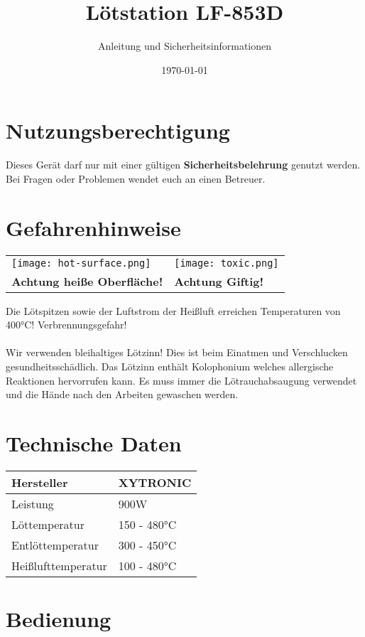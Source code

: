 \documentclass[a4paper]{article}
\begin{document}
\author{Anleitung und Sicherheitsinformationen} %
\title{Lötstation LF-853D}
\date{\today{}} %
\maketitle{} %
\section{Nutzungsberechtigung}
Dieses Gerät darf nur mit einer gültigen \textbf{Sicherheitsbelehrung} genutzt werden. Bei Fragen oder Problemen wendet euch an einen Betreuer.
\section{Gefahrenhinweise}
\begin{center}
	\begin{tabular}{C{5cm}C{5cm}}
		\texttt{[image: hot-surface.png]} & \texttt{[image: toxic.png]}\\
		\textbf{Achtung heiße Oberfläche!} & \textbf{Achtung Giftig!}
	\end{tabular}
\end{center}
Die Lötspitzen sowie der Luftstrom der Heißluft erreichen Temperaturen von 400°C! Verbrennungsgefahr! \\\\
Wir verwenden bleihaltiges Lötzinn! Dies ist beim Einatmen und Verschlucken gesundheitsschädlich. Das Lötzinn enthält Kolophonium welches allergische Reaktionen hervorrufen kann.
Es muss immer die Lötrauchabsaugung verwendet und die Hände nach den Arbeiten gewaschen werden.
\section{Technische Daten}
 \begin{tabular}{|l|l|}
 	\hline
 	Hersteller & XYTRONIC\\
 	\hline
	Leistung & 900W \\
	\hline 
	Löttemperatur & 150 - 480°C\\
	\hline
	Entlöttemperatur & 300 - 450°C\\
	\hline
	Heißlufttemperatur & 100 - 480°C\\
	\hline
\end{tabular}
\newpage
\section{Bedienung}
\end{document}
